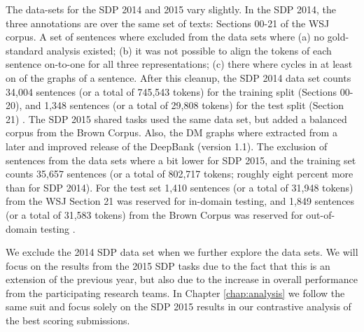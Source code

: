 The data-sets for the SDP 2014 and 2015 vary slightly. In the SDP 2014, the three annotations are over the same set of texts: Sections 00-21 of the WSJ corpus. A set of sentences where excluded from the data sets where (a) no gold-standard analysis existed; (b) it was not possible to align the tokens of each sentence on-to-one for all three representations; (c) there where cycles in at least on of the graphs of a sentence. After this cleanup, the SDP 2014 data set counts 34,004 sentences (or a total of 745,543 tokens) for the training split (Sections 00-20), and 1,348 sentences (or a total of 29,808 tokens) for the test split (Section 21) \cite{Oepen:14}. The SDP 2015 shared tasks used the same data set, but added a balanced corpus from the Brown Corpus. Also, the DM graphs where extracted from a later and improved release of the DeepBank (version 1.1). The exclusion of sentences from the data sets where a bit lower for SDP 2015, and the training set counts 35,657 sentences (or a total of 802,717 tokens; roughly eight percent more than for SDP 2014). For the test set 1,410 sentences (or a total of 31,948 tokens) from the WSJ Section 21 was reserved for in-domain testing, and 1,849 sentences (or a total of 31,583 tokens) from the Brown Corpus was reserved for out-of-domain testing \cite{Oepen:15}.

We exclude the 2014 SDP data set when we further explore the data sets. We will focus on the results from the 2015 SDP tasks due to the fact that this is an extension of the previous year, but also due to the increase in overall performance from the participating research teams. In Chapter \ref{chap:analysis} we follow the same suit and focus solely on the SDP 2015 results in our contrastive analysis of the best scoring submissions.

